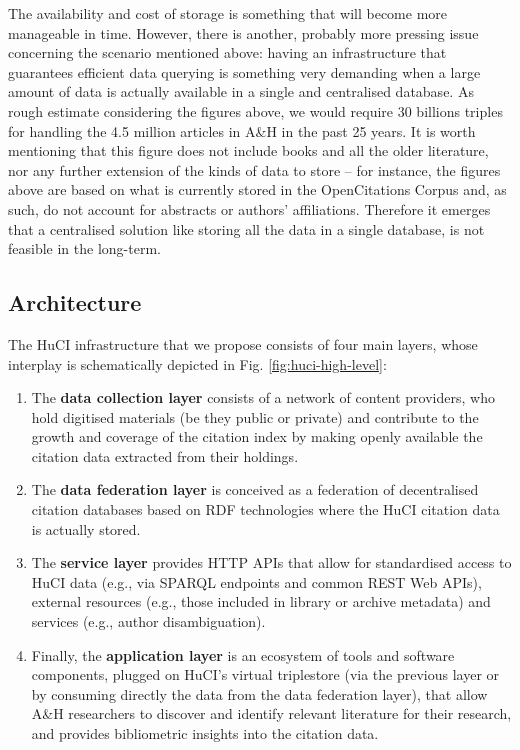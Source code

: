 The availability and cost of storage is something that will become more manageable in time. However, there is another, probably more pressing issue concerning the scenario mentioned above: having an infrastructure that guarantees efficient data querying is something very demanding when a large amount of data is actually available in a single and centralised database. As rough estimate considering the figures above, we would require 30 billions triples for handling the 4.5 million articles in A\&H in the past 25 years. It is worth mentioning that this figure does not include books and all the older literature, nor any further extension of the kinds of data to store – for instance, the figures above are based on what is currently stored in the OpenCitations Corpus and, as such, do not account for abstracts or authors’ affiliations. Therefore it emerges that a centralised solution like storing all the data in a single database, is not feasible in the long-term.

\subsection{Architecture}

The HuCI infrastructure that we propose consists of four main layers, whose interplay is schematically depicted in Fig. \ref{fig:huci-high-level}:
\begin{enumerate}
    \item The \textbf{data collection layer} consists of a network of content providers, who hold digitised materials (be they public or private) and contribute to the growth and coverage of the citation index by making openly available the citation data extracted from their holdings.
    \item The \textbf{data federation layer} is conceived as a federation of decentralised citation databases based on RDF technologies where the HuCI citation data is actually stored.
    \item The \textbf{service layer} provides HTTP APIs that allow for standardised access to HuCI data (e.g., via SPARQL endpoints and common REST Web APIs), external resources (e.g., those included in library or archive metadata) and services (e.g., author disambiguation).
    \item Finally, the \textbf{application layer} is an ecosystem of tools and software components, plugged on HuCI's virtual triplestore (via the previous layer or by consuming directly the data from the data federation layer), that allow A\&H researchers to discover and identify relevant literature for their research, and provides bibliometric insights into the citation data.
\end{enumerate}

